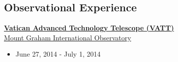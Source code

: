 \documentclass[margin]{res}
\begin{document}
\begin{resume}






\section{Observational Experience}
{\href{http://vaticanobservatory.org/VATT/}{\bf  Vatican Advanced Technology Telescope (VATT)}} \\
\href{http://mgio.arizona.edu}{Mount Graham International Observatory}
\begin{itemize}\itemsep -2pt
   \item June 27, 2014 - July 1, 2014
\end{itemize}
















\end{resume}
\end{document}
